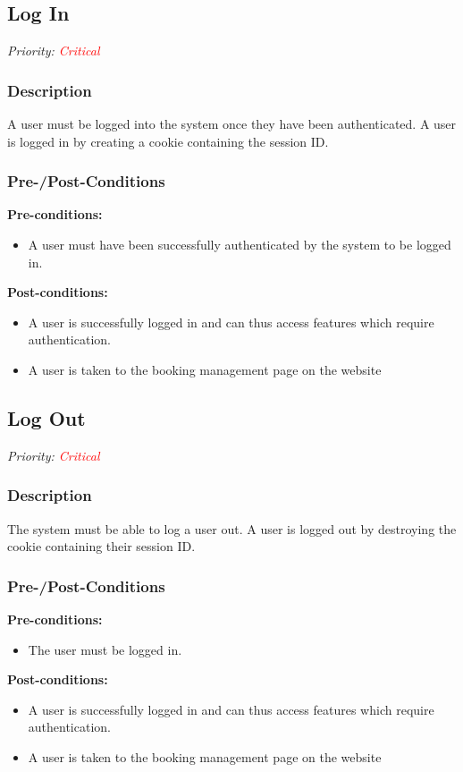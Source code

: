 \subsection{Log In}	
\textit{Priority: \textcolor{red}{Critical}} \\
\subsubsection{Description}
A user must be logged into the system once they have been authenticated. A user is logged in by creating a cookie containing the session ID. \\

\subsubsection{Pre-/Post-Conditions}
	\textbf{Pre-conditions:} 
	\begin{itemize}
		\item A user must have been successfully authenticated by the system to be logged in.
	\end{itemize}
	\textbf{Post-conditions:} 
	\begin{itemize}
		\item A user is successfully logged in and can thus access features which require authentication.
		\item A user is taken to the booking management page on the website
	\end{itemize}
	
\subsection{Log Out}	
\textit{Priority: \textcolor{red}{Critical}} \\
\subsubsection{Description}
The system must be able to log a user out. A user is logged out by destroying the cookie containing their session ID.\\

\subsubsection{Pre-/Post-Conditions}
	\textbf{Pre-conditions:} 
	\begin{itemize}
		\item The user must be logged in.
	\end{itemize}
	\textbf{Post-conditions:} 
	\begin{itemize}
		\item A user is successfully logged in and can thus access features which require authentication.
		\item A user is taken to the booking management page on the website
	\end{itemize}

